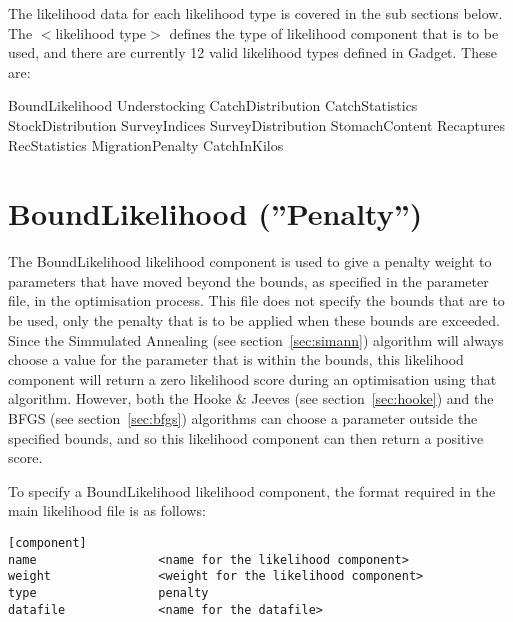 \documentclass[10pt,twoside]{book}
\begin{document}
The likelihood data for each likelihood type is covered in the sub sections below.  The $<$likelihood type$>$ defines the type of likelihood component that is to be used, and there are currently 12 valid likelihood types defined in Gadget.  These are:

\bigskip
BoundLikelihood\newline
Understocking\newline
CatchDistribution\newline
CatchStatistics\newline
StockDistribution\newline
SurveyIndices\newline
SurveyDistribution\newline
StomachContent\newline
Recaptures\newline
RecStatistics\newline
MigrationPenalty\newline
CatchInKilos

\section{BoundLikelihood (''Penalty'')}\label{sec:boundlike}
The BoundLikelihood likelihood component is used to give a penalty weight to parameters that have moved beyond the bounds, as specified in the parameter file, in the optimisation process.  This file does not specify the bounds that are to be used, only the penalty that is to be applied when these bounds are exceeded.  Since the Simmulated Annealing (see section~\ref{sec:simann}) algorithm will always choose a value for the parameter that is within the bounds, this likelihood component will return a zero likelihood score during an optimisation using that algorithm.  However, both the Hooke \& Jeeves (see section~\ref{sec:hooke}) and the BFGS (see section~\ref{sec:bfgs}) algorithms can choose a parameter outside the specified bounds, and so this likelihood component can then return a positive score.

\bigskip
To specify a BoundLikelihood likelihood component, the format required in the main likelihood file is as follows:

{\small\begin{verbatim}
[component]
name                 <name for the likelihood component>
weight               <weight for the likelihood component>
type                 penalty
datafile             <name for the datafile>
\end{verbatim}}
\end{document}
